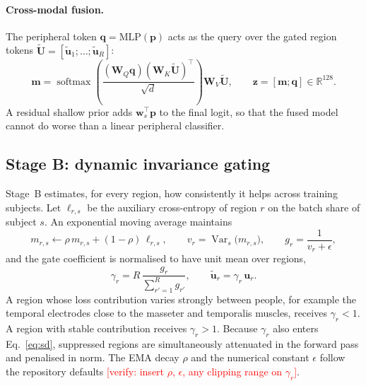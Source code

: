 \documentclass[a4paper,fleqn]{cas-sc}
\newcommand{\vrf}[1]{\textcolor{red}{[verify: #1]}}
\DeclareMathOperator{\softmax}{softmax}
\DeclareMathOperator{\Var}{Var}
\begin{document}
\paragraph{Cross-modal fusion.}
The peripheral token $\mathbf{q}=\mathrm{MLP}(\mathbf{p})$ acts as the query over the gated region tokens $\tilde{\mathbf{U}}=[\tilde{\mathbf{u}}_1;\dots;\tilde{\mathbf{u}}_R]$:
\begin{equation}
\mathbf{m}=\softmax\!\left(\frac{(\mathbf{W}_Q\mathbf{q})(\mathbf{W}_K\tilde{\mathbf{U}})^{\top}}{\sqrt{d}}\right)\mathbf{W}_V\tilde{\mathbf{U}},\qquad
\mathbf{z}=[\mathbf{m};\mathbf{q}]\in\mathbb{R}^{128}.
\end{equation}
A residual shallow prior adds $\mathbf{w}_s^{\top}\mathbf{p}$ to the final logit, so that the fused model cannot do worse than a linear peripheral classifier.

\subsection{Stage B: dynamic invariance gating}
Stage~B estimates, for every region, how consistently it helps across training subjects. Let $\ell_{r,s}$ be the auxiliary cross-entropy of region $r$ on the batch share of subject $s$. An exponential moving average maintains
\begin{equation}
m_{r,s}\leftarrow\rho\,m_{r,s}+(1-\rho)\,\ell_{r,s},\qquad
v_r=\Var_{s}\bigl(m_{r,s}\bigr),\qquad
g_r=\frac{1}{v_r+\epsilon},
\end{equation}
and the gate coefficient is normalised to have unit mean over regions,
\begin{equation}
\gamma_r=R\,\frac{g_r}{\sum_{r'=1}^{R}g_{r'}},\qquad \tilde{\mathbf{u}}_r=\gamma_r\,\mathbf{u}_r .
\end{equation}
A region whose loss contribution varies strongly between people, for example the temporal electrodes close to the masseter and temporalis muscles, receives $\gamma_r<1$. A region with stable contribution receives $\gamma_r>1$. Because $\gamma_r$ also enters Eq.~\eqref{eq:sd}, suppressed regions are simultaneously attenuated in the forward pass and penalised in norm. The EMA decay $\rho$ and the numerical constant $\epsilon$ follow the repository defaults \vrf{insert $\rho$, $\epsilon$, any clipping range on $\gamma_r$}.
\end{document}
